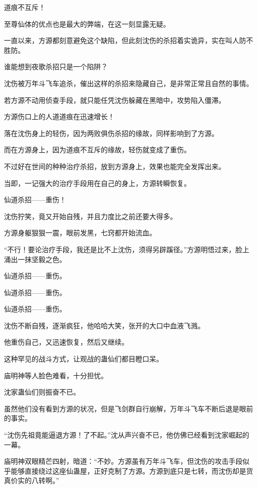 
\begin{this_body}

道痕不互斥！

至尊仙体的优点也是最大的弊端，在这一刻显露无疑。

一直以来，方源都刻意避免这个缺陷，但此刻沈伤的杀招着实诡异，实在叫人防不胜防。

谁能想到夜歌杀招只是一个陷阱？

沈伤被万年斗飞车追杀，催出这样的杀招来隐藏自己，是非常正常且自然的事情。

若方源不动用侦查手段，就只能任凭沈伤躲藏在黑暗中，攻势陷入僵滞。

方源伤口上的人道道痕在迅速增长！

落在沈伤身上的轻伤，因为两败俱伤杀招的缘故，同样影响到了方源。

而在方源身上，因为道痕不互斥的缘故，轻伤就变成了重伤。

不过好在世间的种种治疗杀招，放到方源身上，效果也能完全发挥出来。

当即，一记强大的治疗手段用在自己的身上，方源转瞬恢复。

仙道杀招——重伤！

沈伤狞笑，竟又开始自残，并且力度比之前还要大得多。

方源身躯狠狠一震，眼前发黑，七窍都开始流血。

“不行！要论治疗手段，我还是比不上沈伤，须得另辟蹊径。”方源明悟过来，脸上涌出一抹坚毅之色。

仙道杀招——重伤。

仙道杀招——重伤。

仙道杀招——重伤。

沈伤不断自残，逐渐疯狂，他哈哈大笑，张开的大口中血液飞溅。

他重伤自己，又迅速恢复，然后又继续。

这种罕见的战斗方式，让观战的蛊仙们都目瞪口呆。

庙明神等人脸色难看，十分担忧。

沈家蛊仙们则振奋不已。

虽然他们没有看到方源的状况，但是飞剑群自行崩解，万年斗飞车不断后退是眼前的事实。

“沈伤先祖竟能逼退方源！了不起。”沈从声兴奋不已，他仿佛已经看到沈家崛起的一幕。

庙明神双眼精芒四射，暗道：“不妙。方源虽有万年斗飞车，但沈伤的攻击手段似乎能够直接绕过这座仙蛊屋，正好克制了方源。方源到底只是七转，而沈伤却是货真价实的八转啊。”


\end{this_body}
